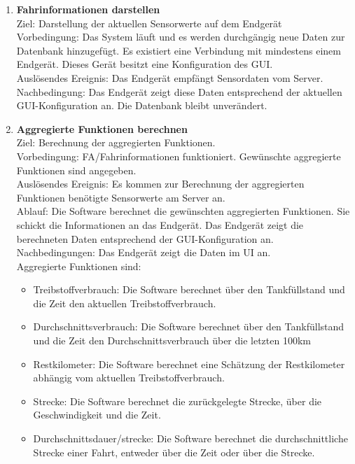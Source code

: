 \documentclass[pflichtenheft.tex]{subfiles}
\begin{document}
	\begin{enumerate}

	\setcounter{enumi}{\value{enumTemp}}


		\item{\textbf{Fahrinformationen darstellen}} \\ Ziel: Darstellung der aktuellen Sensorwerte auf dem Endgerät \\ Vorbedingung: Das System läuft und es werden durchgängig neue Daten zur Datenbank hinzugefügt. Es existiert eine Verbindung mit mindestens einem Endgerät. Dieses Gerät besitzt eine Konfiguration des GUI. \\ Auslösendes Ereignis: Das Endgerät empfängt Sensordaten vom Server.\\ Nachbedingung: Das Endgerät zeigt diese Daten entsprechend der aktuellen GUI-Konfiguration an. Die Datenbank bleibt unverändert.

		\item{\textbf{Aggregierte Funktionen berechnen}} \\ Ziel: Berechnung der aggregierten Funktionen. \\ Vorbedingung: FA/Fahrinformationen funktioniert. Gewünschte aggregierte Funktionen sind angegeben. \\ Auslösendes Ereignis: Es kommen zur Berechnung der aggregierten Funktionen benötigte Sensorwerte am Server an. \\ Ablauf: Die Software berechnet die gewünschten aggregierten Funktionen. Sie schickt die Informationen an das Endgerät. Das Endgerät zeigt die berechneten Daten entsprechend der GUI-Konfiguration an. \\ Nachbedingungen: Das Endgerät zeigt die Daten im UI an.  \\ Aggregierte Funktionen sind:
		\begin{itemize}
			\item Treibstoffverbrauch: Die Software berechnet über den Tankfüllstand und die Zeit den aktuellen Treibstoffverbrauch.
			\item Durchschnittsverbrauch: Die Software berechnet über den Tankfüllstand und die Zeit den Durchschnittsverbrauch über die letzten 100km
			\item Restkilometer: Die Software berechnet eine Schätzung der Restkilometer abhängig vom aktuellen Treibstoffverbrauch.
			\item Strecke: Die Software berechnet die zurückgelegte Strecke, über die Geschwindigkeit und die Zeit.
			\item Durchschnittsdauer/strecke: Die Software berechnet die durchschnittliche Strecke einer Fahrt, entweder über die Zeit oder über die Strecke.
		\end{itemize}


	\setcounter{enumTemp}{\value{enumi}}
	\end{enumerate}
\end{document}
